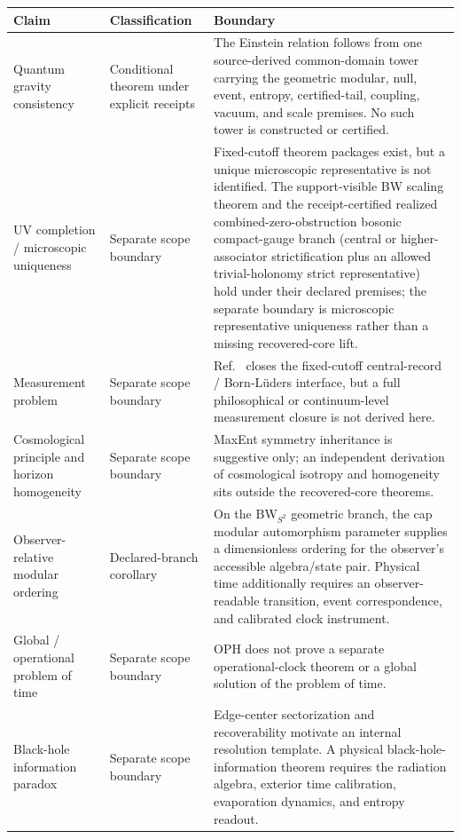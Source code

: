 \begingroup
\scriptsize
\setlength{\tabcolsep}{3pt}
\begin{longtable}{@{}>{\raggedright\arraybackslash}p{}>{\raggedright\arraybackslash}p{}>{\raggedright\arraybackslash}p{}@{}}
\toprule
Claim & Classification & Boundary \\
\midrule
\endhead
Quantum gravity consistency & Conditional theorem under explicit receipts & The Einstein relation follows from one source-derived common-domain tower carrying the geometric modular, null, event, entropy, certified-tail, coupling, vacuum, and scale premises. No such tower is constructed or certified. \\
UV completion / microscopic uniqueness & Separate scope boundary & Fixed-cutoff theorem packages exist, but a unique microscopic representative is not identified. The support-visible BW scaling theorem and the receipt-certified realized combined-zero-obstruction bosonic compact-gauge branch (central or higher-associator strictification plus an allowed trivial-holonomy strict representative) hold under their declared premises; the separate boundary is microscopic representative uniqueness rather than a missing recovered-core lift. \\
Measurement problem & Separate scope boundary & Ref.~\cite{ophmicrophysics} closes the fixed-cutoff central-record / Born-L\"uders interface, but a full philosophical or continuum-level measurement closure is not derived here. \\
Cosmological principle and horizon homogeneity & Separate scope boundary & MaxEnt symmetry inheritance is suggestive only; an independent derivation of cosmological isotropy and homogeneity sits outside the recovered-core theorems. \\
Observer-relative modular ordering & Declared-branch corollary & On the BW\(_{S^2}\) geometric branch, the cap modular automorphism parameter supplies a dimensionless ordering for the observer's accessible algebra/state pair. Physical time additionally requires an observer-readable transition, event correspondence, and calibrated clock instrument. \\
Global / operational problem of time & Separate scope boundary & OPH does not prove a separate operational-clock theorem or a global solution of the problem of time. \\
Black-hole information paradox & Separate scope boundary & Edge-center sectorization and recoverability motivate an internal resolution template. A physical black-hole-information theorem requires the radiation algebra, exterior time calibration, evaporation dynamics, and entropy readout. \\

\end{longtable}

